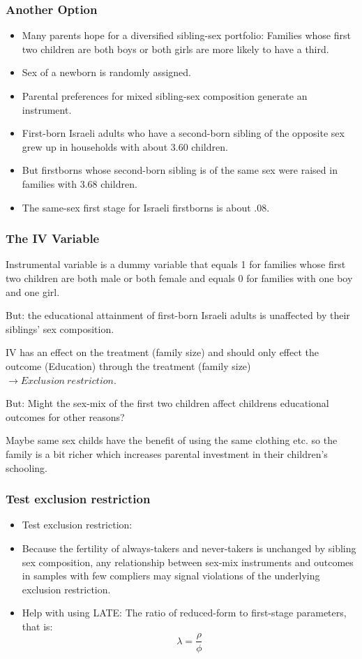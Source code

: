 \documentclass{beamer}
\begin{document}
\begin{frame}
\frametitle{Another Option}
\begin{itemize}
	\item Many parents hope for a diversified sibling-sex portfolio: Families whose first two children are both boys or both girls are more likely to have a third.
	\item Sex of a newborn is randomly assigned.
	\item Parental preferences for mixed sibling-sex composition generate an instrument.
	\item First-born Israeli adults who have a second-born sibling of the opposite sex grew up in households with about 3.60 children.
	\item But firstborns whose second-born sibling is of the same sex were raised in families with 3.68 children. 	
	\item The same-sex first stage for Israeli firstborns is about .08.
\end{itemize}

\end{frame}


\begin{frame}
\frametitle{The IV Variable}
	\item Instrumental variable is a dummy variable that equals 1 for families whose first two children are both male or both female and equals 0 for families with one boy and one girl.
	\item But: the educational attainment of first-born Israeli adults is unaffected by their siblings’ sex composition.
	\item IV has an effect on the treatment (family size) and should only effect the outcome (Education) through the treatment (family size) $\rightarrow Exclusion~restriction.$
	\item But: Might the sex-mix of the first two children affect childrens educational outcomes for other reasons?
	\item Maybe same sex childs have the benefit of using the same clothing etc. so the family is a bit richer which increases parental investment in their children’s schooling.
\end{frame}

\begin{frame}
\frametitle{Test exclusion restriction}
\begin{itemize}
	\item Test exclusion restriction: 
	\item Because the fertility of always-takers and never-takers is unchanged by sibling sex composition, any relationship between sex-mix instruments and outcomes in samples with few compliers may signal violations of the underlying exclusion restriction.
	\item Help with using LATE: The ratio of reduced-form to first-stage parameters, that is:
	$$\lambda = \frac{\rho}{\phi} $$

\end{itemize}
\end{frame}
\end{document}
